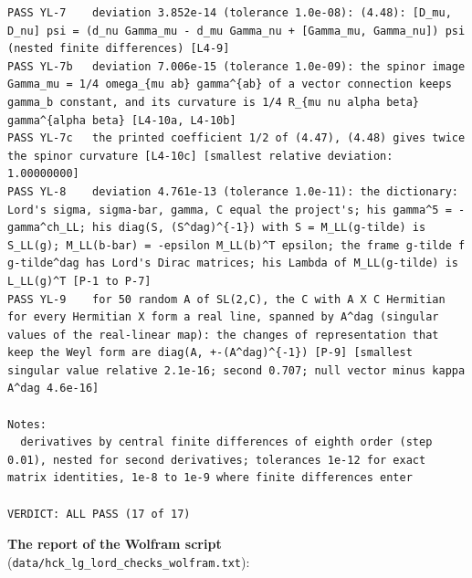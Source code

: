 \documentclass[
  10pt,
]{article}
\begin{document}
\begin{verbatim}
PASS YL-7    deviation 3.852e-14 (tolerance 1.0e-08): (4.48): [D_mu, D_nu] psi = (d_nu Gamma_mu - d_mu Gamma_nu + [Gamma_mu, Gamma_nu]) psi (nested finite differences) [L4-9]
PASS YL-7b   deviation 7.006e-15 (tolerance 1.0e-09): the spinor image Gamma_mu = 1/4 omega_{mu ab} gamma^{ab} of a vector connection keeps gamma_b constant, and its curvature is 1/4 R_{mu nu alpha beta} gamma^{alpha beta} [L4-10a, L4-10b]
PASS YL-7c   the printed coefficient 1/2 of (4.47), (4.48) gives twice the spinor curvature [L4-10c] [smallest relative deviation: 1.00000000]
PASS YL-8    deviation 4.761e-13 (tolerance 1.0e-11): the dictionary: Lord's sigma, sigma-bar, gamma, C equal the project's; his gamma^5 = -gamma^ch_LL; his diag(S, (S^dag)^{-1}) with S = M_LL(g-tilde) is S_LL(g); M_LL(b-bar) = -epsilon M_LL(b)^T epsilon; the frame g-tilde f g-tilde^dag has Lord's Dirac matrices; his Lambda of M_LL(g-tilde) is L_LL(g)^T [P-1 to P-7]
PASS YL-9    for 50 random A of SL(2,C), the C with A X C Hermitian for every Hermitian X form a real line, spanned by A^dag (singular values of the real-linear map): the changes of representation that keep the Weyl form are diag(A, +-(A^dag)^{-1}) [P-9] [smallest singular value relative 2.1e-16; second 0.707; null vector minus kappa A^dag 4.6e-16]

Notes:
  derivatives by central finite differences of eighth order (step 0.01), nested for second derivatives; tolerances 1e-12 for exact matrix identities, 1e-8 to 1e-9 where finite differences enter

VERDICT: ALL PASS (17 of 17)
\end{verbatim}

\textbf{The report of the Wolfram script}
(\texttt{data/hck\_lg\_lord\_checks\_wolfram.txt}):
\end{document}
